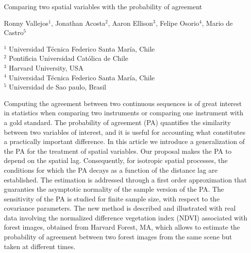 \documentclass[a4paper]{article}
\begin{document}

\Large
 \begin{center}
    Comparing two spatial variables with the probability of agreement\\ 

\hspace{10pt}

\large
Ronny Vallejos$^1$, Jonathan Acosta$^2$, Aaron Ellison$^3$, Felipe Osorio$^4$, Mario de Castro$^5$ \\

\hspace{10pt}

\small  
$^1$ Universidad Técnica Federico Santa María, Chile\\
$^2$ Pontificia Universidad Católica de Chile \\
$^3$ Harvard University, USA\\
$^4$ Universidad Técnica Federico Santa María, Chile\\
$^5$ Universidad de Sao paulo, Brasil\\

\end{center}

\hspace{10pt}

\normalsize

Computing the agreement between two continuous sequences is of great interest in statistics when comparing two instruments or comparing one instrument with a gold standard. The probability of agreement (PA) quantifies the similarity between two variables of interest, and it is useful for accounting what constitutes a practically important difference. In this article we introduce a generalization of the PA for the treatment of spatial variables. Our proposal makes the PA to depend on the spatial lag. Consequently, for isotropic spatial processes, the conditions for which the PA decays as a function of the distance lag are established. The estimation is addressed through a first order approximation that guaranties the asymptotic normality of the sample version of the PA. The sensitivity of the PA is studied for finite sample size, with respect to the covariance parameters. The new method is described and illustrated with real data involving the normalized difference vegetation index (NDVI) associated with forest images, obtained from Harvard Forest, MA, which allows to estimate the probability of agreement between two forest images from the same scene but taken at different times.
\end{document}
